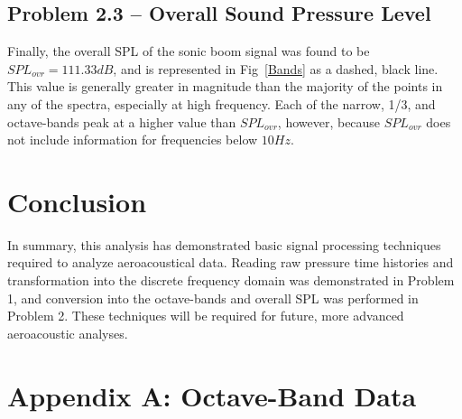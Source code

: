 \documentclass[twocolumn,10pt]{asme2ej}
\begin{document}
\subsection{Problem 2.3 -- Overall Sound Pressure Level}

Finally, the overall SPL of the sonic boom signal was found to be $\boxed{SPL_{ovr}=111.33dB}$, and is represented in Fig~\ref{Bands} as a dashed, black line.  This value is generally greater in magnitude than the majority of the points in any of the spectra, especially at high frequency.  Each of the narrow, 1/3, and octave-bands peak at a higher value than $SPL_{ovr}$, however, because $SPL_{ovr}$ does not include information for frequencies below $10Hz$.





\section{Conclusion}

In summary, this analysis has demonstrated basic signal processing techniques required to analyze aeroacoustical data.  Reading raw pressure time histories and transformation into the discrete frequency domain was demonstrated in Problem 1, and conversion into the octave-bands and overall SPL was performed in Problem 2.  These techniques will be required for future, more advanced aeroacoustic analyses.

\section*{Appendix A: Octave-Band Data}



\vfill %










\end{document}
